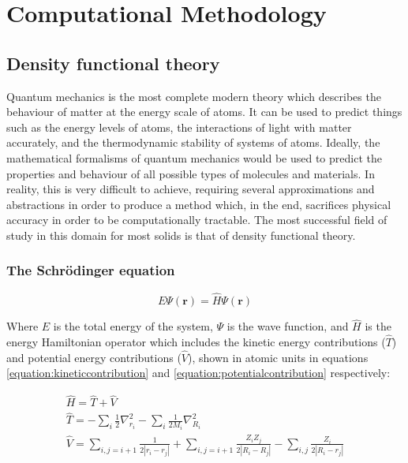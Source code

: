 \chapter{Computational Methodology}

\label{ch:compmethodology}

\section{Density functional theory}

Quantum mechanics is the most complete modern theory which describes the behaviour of matter at the energy scale of atoms. It can be used to predict things such as the energy levels of atoms, the interactions of light with matter accurately, and the thermodynamic stability of systems of atoms. Ideally, the mathematical formalisms of quantum mechanics would be used to predict the properties and behaviour of all possible types of molecules and materials. In reality, this is very difficult to achieve, requiring several approximations and abstractions in order to produce a method which, in the end, sacrifices physical accuracy in order to be computationally tractable. The most successful field of study in this domain for most solids is that of density functional theory.

\subsection{The Schr\"{o}dinger equation}



\begin{equation}
E\Psi(\textbf{r}) = \hat{H}\Psi(\textbf{r})
\label{equation:schrodinger}
\end{equation}

Where $E$ is the total energy of the system, $\Psi$ is the wave function, and $\hat{H}$ is the energy Hamiltonian operator which includes the kinetic energy contributions ($\hat{T}$) and potential energy contributions ($\hat{V}$), shown in atomic units in equations \ref{equation:kineticcontribution} and \ref{equation:potentialcontribution} respectively:

\begin{gather}
\hat{H} = \hat{T} + \hat{V} \label{equation:hamiltonian}\\
\hat{T} = -\sum_i{\frac{1}{2}}\nabla^2_{r_i} - \sum_i{\frac{1}{2M_i}}\nabla^2_{R_i} \label{equation:kineticcontribution} \\
\hat{V} = \sum_{i,j=i+1}{\frac{1}{2|r_i - r_j|}} + \sum_{i,j=i+1}{\frac{Z_i Z_j}{2|R_i - R_j|}} - \sum_{i,j}{\frac{Z_i}{2|R_i - r_j|}} \label{equation:potentialcontribution}
\end{gather}

